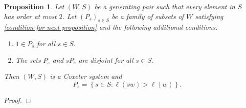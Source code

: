 \documentclass{article}
\theoremstyle{thmstyle}
\newtheorem{proposition}[theorem]{Proposition}
\theoremstyle{defstyle}
\begin{document}
\begin{proposition}
    Let $(W, S)$ be a generating pair such that every element in $S$ has order at most $2$. Let $(P_s)_{s\in S}$ be a family of subsets of $W$ satisfying \ref{condition-for-next-proposition} and the following additional conditions: 
    \begin{enumerate}[label=(\Roman*')]
        \item $1\in P_s$ for all $s\in S$.
        \item The sets $P_s$ and $sP_s$ are disjoint for all $s\in S$.
    \end{enumerate}
    Then $(W, S)$ is a Coxeter system and 
    \begin{equation*}
        P_s = \left\{s\in S\colon \ell(sw) > \ell(w)\right\}.
    \end{equation*}
\end{proposition}
\begin{proof}
    
\end{proof}
\end{document}
